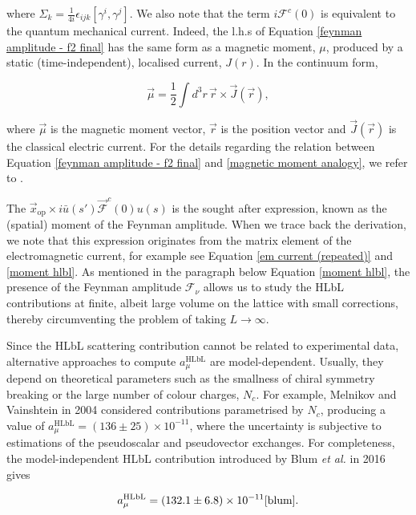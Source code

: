 \documentclass{article}
\numberwithin{equation}{section} %
\begin{document}
\noindent where $\Sigma_k = \frac{1}{4i}\epsilon_{ijk}[\gamma^i,\gamma^j]$. We also note that the term $i\mathcal{F}^c(0)$ is equivalent to the quantum mechanical current. Indeed, the l.h.s of Equation \ref{feynman amplitude - f2 final} has the same form as a magnetic moment, $\mu$, produced by a static (time-independent), localised current, $J(r)$. In the continuum form, 

\begin{equation}
\vec{\mu} = \frac{1}{2}\int d^3r \, \vec{r} \times \vec{J}(\vec{r}),
\label{magnetic moment analogy}
\end{equation}

\noindent where $\vec{\mu}$ is the magnetic moment vector, $\vec{r}$ is the position vector and $\vec{J}(\vec{r})$ is the classical electric current. For the details regarding the relation between Equation \ref{feynman amplitude - f2 final} and \ref{magnetic moment analogy}, we refer to \cite{blum}.

The $\vec{x}_{\mathrm{op}} \times i\bar{u}(s')\vec{\mathcal{F}}^c(0)u(s)$ is the sought after expression, known as the (spatial) moment of the Feynman amplitude. When we trace back the derivation, we note that this expression originates from the matrix element of the electromagnetic current, for example see Equation \ref{em current (repeated)} and \ref{moment hlbl}. As mentioned in the paragraph below Equation \ref{moment hlbl}, the presence of the Feynman amplitude $\mathcal{F}_\nu$ allows us to study the HLbL contributions at finite, albeit large volume on the lattice with small corrections, thereby circumventing the problem of taking $L\rightarrow \infty$. 

Since the HLbL scattering contribution cannot be related to experimental data, alternative approaches to compute $a_\mu^\mathrm{HLbL}$ are model-dependent\cite{vainshtein}. Usually, they depend on theoretical parameters such as the smallness of chiral symmetry breaking or the large number of colour charges, $N_c$\cite{vainshtein}. For example, Melnikov and Vainshtein in 2004 considered contributions parametrised by $N_c$, producing a value of $a_\mu^\mathrm{HLbL} = (136\pm 25)\times 10^{-11}$, where the uncertainty is subjective to estimations of the pseudoscalar and pseudovector exchanges\cite{vainshtein}. For completeness, the model-independent HLbL contribution introduced by Blum \textit{et al.} in 2016 gives

\begin{equation}
a_\mu^\mathrm{HLbL} = (132.1 \pm 6.8) \times 10^{-11}\text{\cite{blum}}.
\end{equation}
\end{document}
